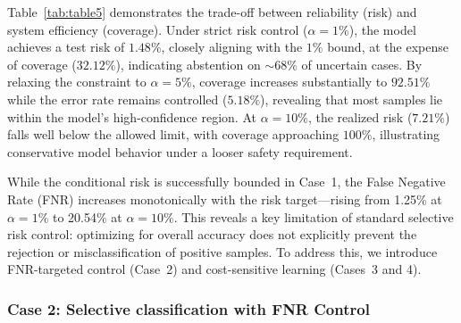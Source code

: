 \documentclass[journal]{IEEEtran}
\theoremstyle{remark}
\begin{document}
Table~\ref{tab:table5} demonstrates the trade-off between reliability (risk) and system efficiency (coverage). Under strict risk control ($\alpha=1\%$), the model achieves a test risk of $1.48\%$, closely aligning with the $1\%$ bound, at the expense of coverage ($32.12\%$), indicating abstention on ${\sim}68\%$ of uncertain cases. By relaxing the constraint to $\alpha=5\%$, coverage increases substantially to $92.51\%$ while the error rate remains controlled ($5.18\%$), revealing that most samples lie within the model’s high-confidence region. At $\alpha=10\%$, the realized risk ($7.21\%$) falls well below the allowed limit, with coverage approaching $100\%$, illustrating conservative model behavior under a looser safety requirement.

\begin{table}[htbp]
    \centering
    \caption{The selective classification performance of Case 1.}
    \label{tab:table5}
    \vskip -0.1in
\end{table}

While the conditional risk is successfully bounded in Case~1, the False Negative Rate (FNR) increases monotonically with the risk target—rising from 1.25\% at $\alpha=1\%$ to 20.54\% at $\alpha=10\%$. This reveals a key limitation of standard selective risk control: optimizing for overall accuracy does not explicitly prevent the rejection or misclassification of positive samples. To address this, we introduce FNR-targeted control (Case~2) and cost-sensitive learning (Cases~3 and 4).

\subsubsection{\textbf{Case 2: Selective classification with FNR Control}}
\label{sec:case2_results}
\end{document}
